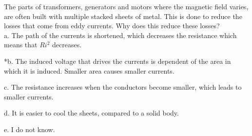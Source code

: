 
The parts of transformers, generators and motors where the magnetic
field varies, are often built with multiple stacked sheets of metal.
This is done to reduce the losses that come from eddy currents. Why does
this reduce these losses?\\

a. The path of the currents is shortened, which decreases the resistance
which means that \(Ri^2\) decreases.

*b. The induced voltage that drives the currents is dependent of the area
in which it is induced. Smaller area causes smaller currents.

c. The resistance increases when the conductors become smaller, which
leads to smaller currents.

d. It is easier to cool the sheets, compared to a solid body.

e. I do not know.\\
